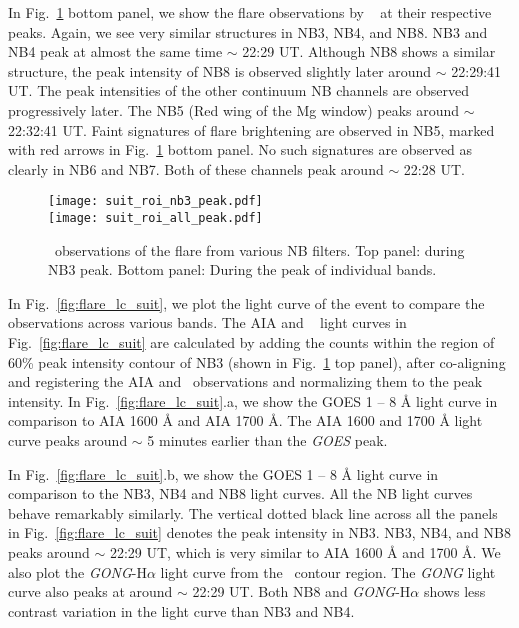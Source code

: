 In Fig.~\ref{fig:flare_nb3_peak} bottom panel, we show the flare observations by \suit~ at their respective peaks. Again, we see very similar structures in NB3, NB4, and NB8. NB3 and NB4 peak at almost the same time $\sim$ 22:29 UT. Although NB8 shows a similar structure, the peak intensity of NB8 is observed slightly later around $\sim$ 22:29:41 UT. The peak intensities of the other continuum NB channels are observed progressively later. The NB5 (Red wing of the Mg window) peaks around $\sim$ 22:32:41 UT. Faint signatures of flare brightening are observed in NB5, marked with red arrows in Fig.~\ref{fig:flare_nb3_peak} bottom panel. No such signatures are observed as clearly in NB6 and NB7. Both of these channels peak around $\sim$ 22:28 UT.

\begin{figure}[ht!]
    \centering
    \texttt{[image: suit\_roi\_nb3\_peak.pdf]} \\
    \texttt{[image: suit\_roi\_all\_peak.pdf]}
    \caption{\suit~observations of the flare from various NB filters. Top panel: during NB3 peak. Bottom panel: During the peak of individual bands.}
    \label{fig:flare_nb3_peak}
\end{figure}

In Fig.~\ref{fig:flare_lc_suit}, we plot the light curve of the event to compare the observations across various bands. The AIA and \suit~ light curves in Fig.~\ref{fig:flare_lc_suit} are calculated by adding the counts within the region of 60\% peak intensity contour of NB3 (shown in Fig.~\ref{fig:flare_nb3_peak} top panel), after co-aligning and registering the AIA and \suit~observations and normalizing them to the peak intensity. In Fig.~\ref{fig:flare_lc_suit}.a, we show the GOES 1 {--} 8 {\AA} light curve in comparison to AIA 1600 {\AA} and AIA 1700 {\AA}. The AIA 1600 and 1700 {\AA} light curve peaks around $\sim$ 5 minutes earlier than the {\it GOES} peak. 

In Fig.~\ref{fig:flare_lc_suit}.b, we show the GOES 1 {--} 8 {\AA} light curve in comparison to the NB3, NB4 and NB8 light curves. All the NB light curves behave remarkably similarly. The vertical dotted black line across all the panels in Fig.~\ref{fig:flare_lc_suit} denotes the peak intensity in NB3. NB3, NB4, and NB8 peaks around $\sim$ 22:29 UT, which is very similar to AIA 1600 {\AA} and 1700 {\AA}. We also plot the {\it GONG}-H$\alpha$ light curve from the \suit~contour region. The {\it GONG} light curve also peaks at around $\sim$ 22:29 UT. Both NB8 and {\it GONG}-H$\alpha$ shows less contrast variation in the light curve than NB3 and NB4.

